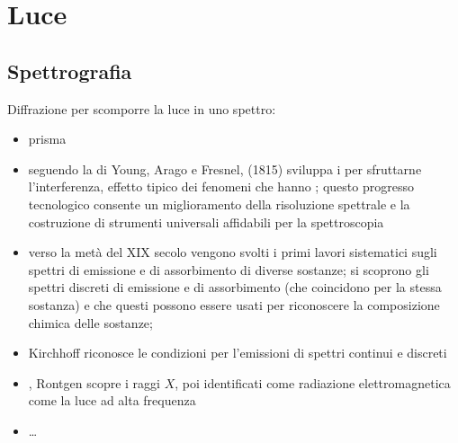 \documentclass[letterpaper,10pt,italian]{jupyterBook}
\begin{document}
\section{Luce}
\label{\detokenize{ch/electromagnetism/em-waves:luce}}\label{\detokenize{ch/electromagnetism/em-waves:physics-hs-electromagnetism-em-waves-light}}

\subsection{Spettrografia}
\label{\detokenize{ch/electromagnetism/em-waves:spettrografia}}\label{\detokenize{ch/electromagnetism/em-waves:physics-hs-electromagnetism-em-waves-spectrography}}
\sphinxAtStartPar
Diffrazione per scomporre la luce in uno spettro:
\begin{itemize}
\item {} 
\sphinxAtStartPar
prisma

\item {} 
\sphinxAtStartPar
seguendo la  di Young, Arago e Fresnel,  (1815) sviluppa i  {\hyperref[\detokenize{ch/waves/intro:physics-hs-waves-effects-diffraction}]{}} per sfruttarne l’interferenza, effetto tipico dei fenomeni che hanno ; questo progresso tecnologico consente un miglioramento della risoluzione spettrale e la costruzione di strumenti universali affidabili per la spettroscopia

\item {} 
\sphinxAtStartPar
verso la metà del XIX secolo vengono svolti i primi lavori sistematici sugli spettri di emissione e di assorbimento di diverse sostanze; si scoprono gli spettri discreti di emissione e di assorbimento (che coincidono per la stessa sostanza) e che questi possono essere usati per riconoscere la composizione chimica delle sostanze;

\item {} 
\sphinxAtStartPar
Kirchhoff riconosce le condizioni per l’emissioni di spettri continui e discreti

\item {} 
, Rontgen scopre i raggi \(X\), poi identificati come radiazione elettromagnetica \sphinxhyphen{} come la luce \sphinxhyphen{} ad alta frequenza

\item {} 
\sphinxAtStartPar
…

\end{itemize}
\end{document}
